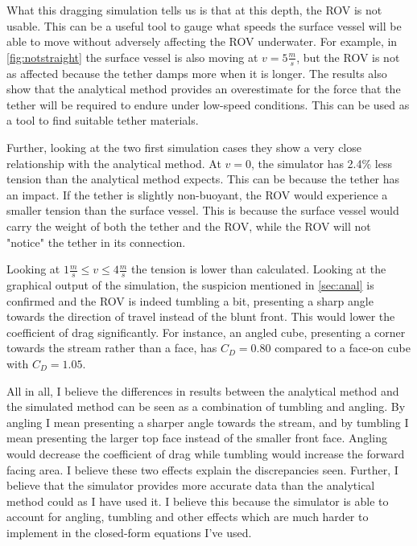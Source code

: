 What this dragging simulation tells us is that at this depth, the ROV is not usable. This can be a useful tool to gauge what speeds the surface vessel will be able to move without adversely affecting the ROV underwater. For example, in \cref{fig:notstraight} the surface vessel is also moving at \(v=5\frac m s\), but the ROV is not as affected because the tether damps more when it is longer. The results also show that the analytical method provides an overestimate for the force that the tether will be required to endure under low-speed conditions. This can be used as a tool to find suitable tether materials.

Further, looking at the two first simulation cases they show a very close relationship with the analytical method. At \(v=0\), the simulator has 2.4\% less tension than the analytical method expects. This can be because the tether has an impact. If the tether is slightly non-buoyant, the ROV would experience a smaller tension than the surface vessel. This is because the surface vessel would carry the weight of both the tether and the ROV, while the ROV will not "notice" the tether in its connection.

Looking at \(1\frac{m}{s} \leq v \leq 4\frac m s\) the tension is lower than calculated. Looking at the graphical output of the simulation, the suspicion mentioned in \cref{sec:anal} is confirmed and the ROV is indeed tumbling a bit, presenting a sharp angle towards the direction of travel instead of the blunt front. This would lower the coefficient of drag significantly. For instance, an angled cube, presenting a corner towards the stream rather than a face, has \(C_D = 0.80\) compared to a face-on cube with \(C_D=1.05\). 

All in all, I believe the differences in results between the analytical method and the simulated method can be seen as a combination of tumbling and angling. By angling I mean presenting a sharper angle towards the stream, and by tumbling I mean presenting the larger top face instead of the smaller front face. Angling would decrease the coefficient of drag while tumbling would increase the forward facing area. I believe these two effects explain the discrepancies seen. Further, I believe that the simulator provides more accurate data than the analytical method could as I have used it. I believe this because the simulator is able to account for angling, tumbling and other effects which are much harder to implement in the closed-form equations I've used. 

